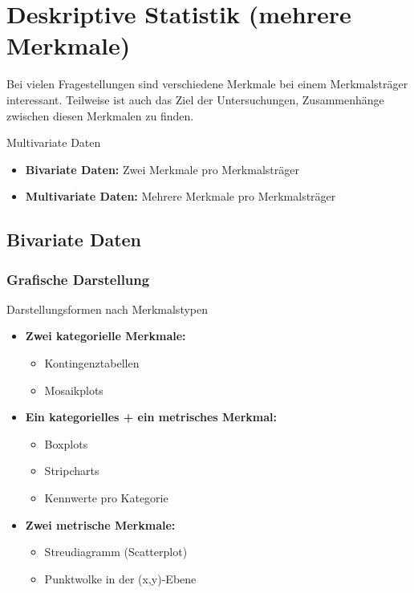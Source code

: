 \section{Deskriptive Statistik (mehrere Merkmale)}

Bei vielen Fragestellungen sind verschiedene Merkmale bei einem Merkmalsträger interessant. Teilweise ist auch das Ziel der Untersuchungen, Zusammenhänge zwischen diesen Merkmalen zu finden.

\begin{definition}{Multivariate Daten}
\begin{itemize}
    \item \textbf{Bivariate Daten:} Zwei Merkmale pro Merkmalsträger
    \item \textbf{Multivariate Daten:} Mehrere Merkmale pro Merkmalsträger
\end{itemize}
\end{definition}

\subsection{Bivariate Daten}

\subsubsection{Grafische Darstellung}

\begin{concept}{Darstellungsformen nach Merkmalstypen}
\begin{itemize}
    \item \textbf{Zwei kategorielle Merkmale:}
    \begin{itemize}
        \item Kontingenztabellen
        \item Mosaikplots
    \end{itemize}
    \item \textbf{Ein kategorielles + ein metrisches Merkmal:}
    \begin{itemize}
        \item Boxplots
        \item Stripcharts
        \item Kennwerte pro Kategorie
    \end{itemize}
    \item \textbf{Zwei metrische Merkmale:}
    \begin{itemize}
        \item Streudiagramm (Scatterplot)
        \item Punktwolke in der (x,y)-Ebene
    \end{itemize}
\end{itemize}
\end{concept}

